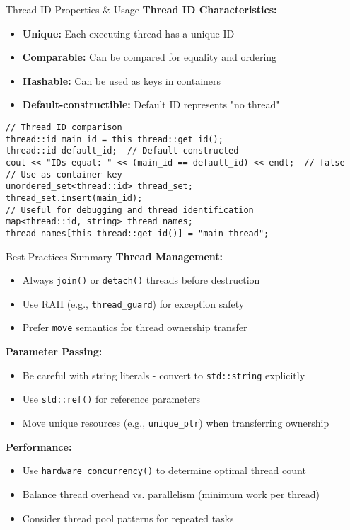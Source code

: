 \begin{frame}[fragile]{Thread ID Properties \& Usage}
	\textbf{Thread ID Characteristics:}
	\begin{itemize}
		\item \textbf{Unique:} Each executing thread has a unique ID
		\item \textbf{Comparable:} Can be compared for equality and ordering
		\item \textbf{Hashable:} Can be used as keys in containers
		\item \textbf{Default-constructible:} Default ID represents "no thread"
	\end{itemize}

	\begin{verbatim}
// Thread ID comparison
thread::id main_id = this_thread::get_id();
thread::id default_id;  // Default-constructed
cout << "IDs equal: " << (main_id == default_id) << endl;  // false
// Use as container key
unordered_set<thread::id> thread_set;
thread_set.insert(main_id);
// Useful for debugging and thread identification
map<thread::id, string> thread_names;
thread_names[this_thread::get_id()] = "main_thread";
	\end{verbatim}
\end{frame}

\begin{frame}[fragile]{ Best Practices Summary}
	\scriptsize
	\textbf{Thread Management:}
	\begin{itemize}
		\item Always \texttt{join()} or \texttt{detach()} threads before destruction
		\item Use RAII (e.g., \texttt{thread\_guard}) for exception safety
		\item Prefer \texttt{move} semantics for thread ownership transfer
	\end{itemize}

	\textbf{Parameter Passing:}
	\begin{itemize}
		\item Be careful with string literals - convert to \texttt{std::string} explicitly
		\item Use \texttt{std::ref()} for reference parameters
		\item Move unique resources (e.g., \texttt{unique\_ptr}) when transferring ownership
	\end{itemize}

	\textbf{Performance:}
	\begin{itemize}
		\item Use \texttt{hardware\_concurrency()} to determine optimal thread count
		\item Balance thread overhead vs. parallelism (minimum work per thread)
		\item Consider thread pool patterns for repeated tasks
	\end{itemize}
\end{frame}


